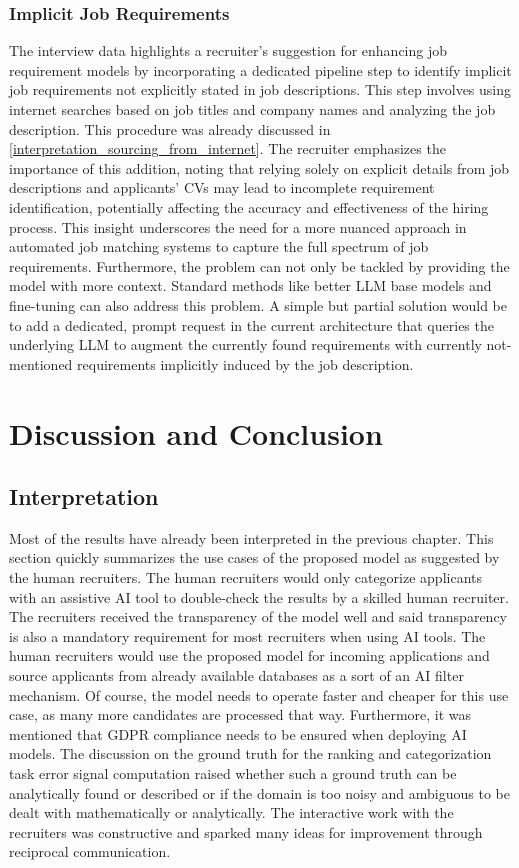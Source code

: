 \documentclass[draft,final]{thesisclass} %
\begin{document}
\subsection{Implicit Job Requirements}
The interview data highlights a recruiter's suggestion for enhancing job requirement models by incorporating a dedicated pipeline step to identify implicit job requirements not explicitly stated in job descriptions. This step involves using internet searches based on job titles and company names and analyzing the job description. This procedure was already discussed in \ref{interpretation_sourcing_from_internet}. The recruiter emphasizes the importance of this addition, noting that relying solely on explicit details from job descriptions and applicants' \acs{CV}s may lead to incomplete requirement identification, potentially affecting the accuracy and effectiveness of the hiring process. This insight underscores the need for a more nuanced approach in automated job matching systems to capture the full spectrum of job requirements.
Furthermore, the problem can not only be tackled by providing the model with more context. Standard methods like better \gls{LLM} base models and fine-tuning can also address this problem. A simple but partial solution would be to add a dedicated, prompt request in the current architecture that queries the underlying \gls{LLM} to augment the currently found requirements with currently not-mentioned requirements implicitly induced by the job description.

\chapter{Discussion and Conclusion} \label{discussion_and_conclusion}

\section{Interpretation}
Most of the results have already been interpreted in the previous chapter. This section quickly summarizes the use cases of the proposed model as suggested by the human recruiters. The human recruiters would only categorize applicants with an assistive \acs{AI} tool to double-check the results by a skilled human recruiter. The recruiters received the transparency of the model well and said transparency is also a mandatory requirement for most recruiters when using \acs{AI} tools. The human recruiters would use the proposed model for incoming applications and source applicants from already available databases as a sort of an \acs{AI} filter mechanism. Of course, the model needs to operate faster and cheaper for this use case, as many more candidates are processed that way.
Furthermore, it was mentioned that \acs{GDPR} compliance needs to be ensured when deploying \acs{AI} models. The discussion on the ground truth for the ranking and categorization task error signal computation raised whether such a ground truth can be analytically found or described or if the domain is too noisy and ambiguous to be dealt with mathematically or analytically. The interactive work with the recruiters was constructive and sparked many ideas for improvement through reciprocal communication. 
\end{document}
